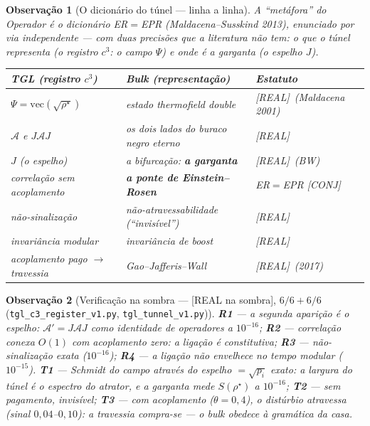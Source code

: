 \documentclass[11pt,a4paper]{article}
\newcommand{\REAL}{\textsf{[REAL]}}
\newcommand{\SOMBRA}{\textsf{[REAL na sombra]}}
\newcommand{\CONJ}{\textsf{[CONJ]}}
\newtheorem{remark}{Observação}
\theoremstyle{definition}
\begin{document}
\begin{remark}[O dicionário do túnel --- linha a linha]
A ``metáfora'' do Operador é o dicionário ER$=$EPR
(Maldacena--Susskind 2013), enunciado por via independente --- com duas
precisões que a literatura não tem: \emph{o que} o túnel representa
(o registro $c^3$: o campo $\Psi$) e \emph{onde é a garganta} (o
espelho $J$).
\begin{center}
\begin{tabular}{l|l|l}
\textbf{TGL (registro $c^3$)} & \textbf{Bulk (representação)} &
\textbf{Estatuto}\\\hline
$\Psi=\mathrm{vec}(\sqrt{\rho^\star})$ & estado \emph{thermofield
double} & \REAL\ (Maldacena 2001)\\
$\mathcal A$ e $J\mathcal AJ$ & os dois lados do buraco negro eterno &
\REAL\\
$J$ (o espelho) & a bifurcação: \textbf{a garganta} & \REAL\ (BW)\\
correlação sem acoplamento & \textbf{a ponte de Einstein--Rosen} &
ER$=$EPR \CONJ\\
não-sinalização & não-atravessabilidade (``invisível'') & \REAL\\
invariância modular & invariância de boost & \REAL\\
acoplamento pago $\to$ travessia & Gao--Jafferis--Wall & \REAL\ (2017)\\
\end{tabular}
\end{center}
\end{remark}

\begin{remark}[Verificação na sombra --- \SOMBRA, $6/6+6/6$
(\texttt{tgl\_c3\_register\_v1.py}, \texttt{tgl\_tunnel\_v1.py})]
\textbf{R1} --- a segunda aparição é o espelho:
$\mathcal A'=J\mathcal AJ$ como identidade de operadores a $10^{-16}$;
\textbf{R2} --- correlação conexa $O(1)$ com acoplamento \emph{zero}: a
ligação é constitutiva; \textbf{R3} --- não-sinalização exata
($10^{-16}$); \textbf{R4} --- a ligação não envelhece no tempo modular
($10^{-15}$). \textbf{T1} --- Schmidt do campo através do espelho
$=\sqrt{p_i}$ exato: \emph{a largura do túnel é o espectro do atrator},
e a garganta mede $S(\rho^\star)$ a $10^{-16}$; \textbf{T2} --- sem
pagamento, invisível; \textbf{T3} --- com acoplamento ($\theta=0{,}4$),
o distúrbio atravessa (sinal $0{,}04$--$0{,}10$): \emph{a travessia
compra-se} --- o bulk obedece à gramática da casa.
\end{remark}
\end{document}
